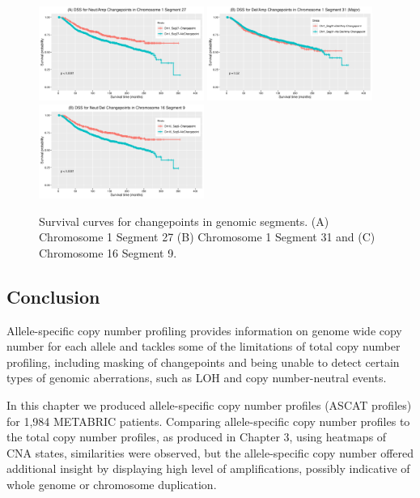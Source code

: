 \begin{figure}[!htb]
\centering
\includegraphics[width = 0.48\textwidth]{../figures/Chapter_6/survplot_Chr1Seg27.png}
\includegraphics[width = 0.48\textwidth]{../figures/Chapter_6/survplot_Chr1Seg31.png}
\includegraphics[width = 0.48\textwidth]{../figures/Chapter_6/survplot_Chr16Seg9.png}
\caption[Survival curves for changepoints in genomic segments.]{Survival curves for changepoints in genomic segments. (A) Chromosome 1 Segment 27 (B) Chromosome 1 Segment 31 and (C) Chromosome 16 Segment 9.}
\label{fig:TopLength_Segments_Surv}
\end{figure}

\subsection{Conclusion}
Allele-specific copy number profiling provides information on genome wide copy number for each allele and tackles some of the limitations of total copy number profiling, including masking of changepoints and being unable to detect certain types of genomic aberrations, such as LOH and copy number-neutral events.

In this chapter we produced allele-specific copy number profiles (ASCAT profiles) for 1,984 METABRIC patients. Comparing allele-specific copy number profiles to the total copy number profiles, as produced in Chapter 3, using heatmaps of CNA states, similarities were observed, but the allele-specific copy number offered additional insight by displaying high level of amplifications, possibly indicative of whole genome or chromosome duplication. 

